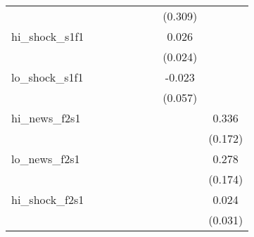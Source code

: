 {\begin{tabular}{l*{8}{c}}
            &                     &                     &                     &                     &                     &                     &     (0.309)         &                     \\
\addlinespace
hi\_shock\_s1f1&                     &                     &                     &                     &                     &                     &       0.026         &                     \\
            &                     &                     &                     &                     &                     &                     &     (0.024)         &                     \\
\addlinespace
lo\_shock\_s1f1&                     &                     &                     &                     &                     &                     &      -0.023         &                     \\
            &                     &                     &                     &                     &                     &                     &     (0.057)         &                     \\
\addlinespace
hi\_news\_f2s1&                     &                     &                     &                     &                     &                     &                     &       0.336\sym{*}  \\
            &                     &                     &                     &                     &                     &                     &                     &     (0.172)         \\
\addlinespace
lo\_news\_f2s1&                     &                     &                     &                     &                     &                     &                     &       0.278         \\
            &                     &                     &                     &                     &                     &                     &                     &     (0.174)         \\
\addlinespace
hi\_shock\_f2s1&                     &                     &                     &                     &                     &                     &                     &       0.024         \\
            &                     &                     &                     &                     &                     &                     &                     &     (0.031)         \\

\end{tabular}}
